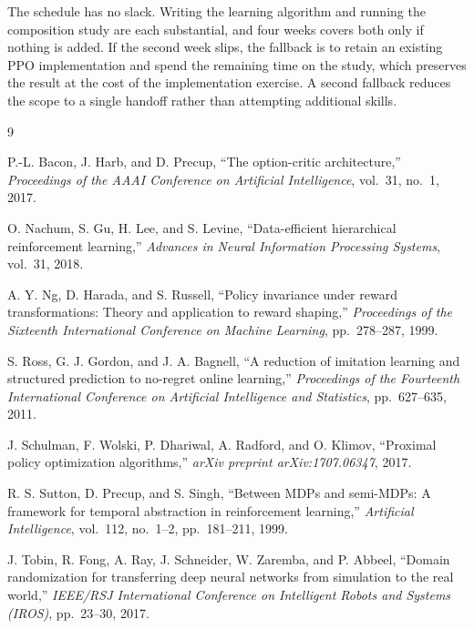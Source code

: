 \documentclass[11pt]{article}
\begin{document}
The schedule has no slack. Writing the learning algorithm and running the composition
study are each substantial, and four weeks covers both only if nothing is added. If the
second week slips, the fallback is to retain an existing PPO implementation and spend
the remaining time on the study, which preserves the result at the cost of the
implementation exercise. A second fallback reduces the scope to a single handoff rather
than attempting additional skills.

\begin{thebibliography}{9}

P.-L. Bacon, J. Harb, and D. Precup, ``The option-critic architecture,''
\emph{Proceedings of the AAAI Conference on Artificial Intelligence}, vol.~31,
no.~1, 2017.

O. Nachum, S. Gu, H. Lee, and S. Levine, ``Data-efficient hierarchical reinforcement
learning,'' \emph{Advances in Neural Information Processing Systems}, vol.~31, 2018.

A. Y. Ng, D. Harada, and S. Russell, ``Policy invariance under reward transformations:
Theory and application to reward shaping,'' \emph{Proceedings of the Sixteenth
International Conference on Machine Learning}, pp.~278--287, 1999.

S. Ross, G. J. Gordon, and J. A. Bagnell, ``A reduction of imitation learning and
structured prediction to no-regret online learning,'' \emph{Proceedings of the
Fourteenth International Conference on Artificial Intelligence and Statistics},
pp.~627--635, 2011.

J. Schulman, F. Wolski, P. Dhariwal, A. Radford, and O. Klimov, ``Proximal policy
optimization algorithms,'' \emph{arXiv preprint arXiv:1707.06347}, 2017.

R. S. Sutton, D. Precup, and S. Singh, ``Between MDPs and semi-MDPs: A framework for
temporal abstraction in reinforcement learning,'' \emph{Artificial Intelligence},
vol.~112, no.~1--2, pp.~181--211, 1999.

J. Tobin, R. Fong, A. Ray, J. Schneider, W. Zaremba, and P. Abbeel, ``Domain
randomization for transferring deep neural networks from simulation to the real
world,'' \emph{IEEE/RSJ International Conference on Intelligent Robots and Systems
(IROS)}, pp.~23--30, 2017.

\end{thebibliography}
\end{document}
